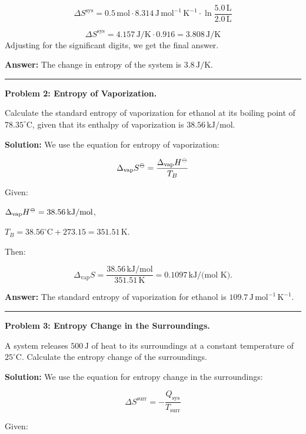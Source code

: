 \documentclass[
  9pt,
]{extbook}
\theoremstyle{definition}
\theoremstyle{definition}
\theoremstyle{definition}
\theoremstyle{definition}
\theoremstyle{remark}
\begin{document}
\[\Delta S^{\text{sys}} = 0.5\,\text{mol} \cdot 8.314\,\text{J} \, \text{mol}^{-1} \, \text{K}^{-1} \cdot \ln \frac{5.0\,\text{L}}{2.0\,\text{L}}\]

\[\Delta S^{\text{sys}} = 4.157\,\text{J/K} \cdot 0.916 = 3.808\,\text{J/K}\]
Adjusting for the significant digits, we get the final answer.

\textbf{Answer:} The change in entropy of the system is \(3.8\,\text{J/K}\).

\begin{center}\rule{0.5\linewidth}{0.5pt}\end{center}

\textbf{Problem 2: Entropy of Vaporization.}

Calculate the standard entropy of vaporization for ethanol at its boiling point of \(78.35^\circ\text{C}\), given that its enthalpy of vaporization is \(38.56\,\text{kJ/mol}\).

\textbf{Solution:} We use the equation for entropy of vaporization:

\[\Delta_{\text{vap}} S^{-\kern-6pt{\ominus}\kern-6pt-}= \frac{\Delta_{\text{vap}} H^{-\kern-6pt{\ominus}\kern-6pt-}}{T_B}\]

Given:

\(\Delta_{\text{vap}} H^{-\kern-6pt{\ominus}\kern-6pt-}= 38.56\,\text{kJ/mol}\),

\(T_B = 38.56^\circ\text{C}+273.15=351.51\,\text{K}\).

Then:

\[\Delta_{\text{vap}} S = \frac{38.56\,\text{kJ/mol}}{351.51\,\text{K}} = 0.1097\,\text{kJ/(mol K)}.\]

\textbf{Answer:} The standard entropy of vaporization for ethanol is \(109.7\,\text{J} \, \text{mol}^{-1} \, \text{K}^{-1}\).

\begin{center}\rule{0.5\linewidth}{0.5pt}\end{center}

\textbf{Problem 3: Entropy Change in the Surroundings.}

A system releases \(500\,\text{J}\) of heat to its surroundings at a constant temperature of \(25^\circ\text{C}\). Calculate the entropy change of the surroundings.

\textbf{Solution:} We use the equation for entropy change in the surroundings:

\[\Delta S^{\text{surr}} = -\frac{Q_{\text{sys}}}{T_{\text{surr}}}\]

Given:
\end{document}
